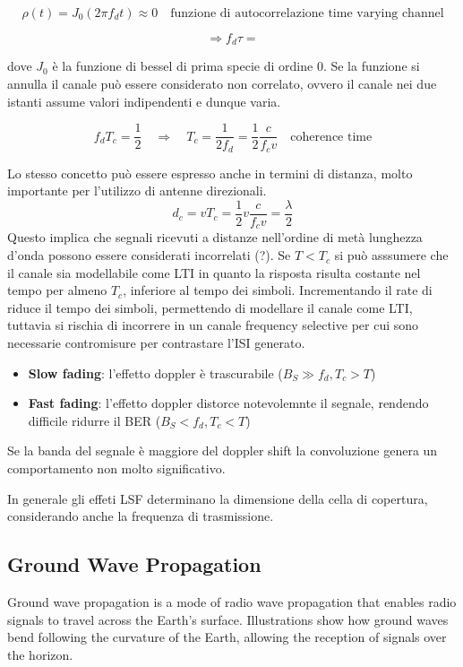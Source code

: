 \[
    \rho (t) = J_0(2\pi f_d t) \approx 0 \quad \text{funzione di autocorrelazione time varying channel}
\]

\[
    \Rightarrow f_d \tau = 
\]


dove $J_0$ è la funzione di bessel di prima specie di ordine 0.  Se la funzione si annulla il canale può essere considerato non correlato, ovvero il canale nei due istanti assume valori indipendenti e dunque varia.


\[
    f_d T_c = \frac{1}{2} \quad \Rightarrow \quad  T_c = \frac{1}{2 f_d} = \frac{1}{2} \frac{c}{f_c v} \quad \text{coherence time}
\]

Lo stesso concetto può essere espresso anche in termini di distanza, molto importante per l'utilizzo di antenne direzionali.
\[
    d_c = v T_c = \frac{1}{2} v \frac{c}{f_c v} = \frac{\lambda}{2}
\]
Questo implica che segnali ricevuti a distanze nell'ordine di metà lunghezza d'onda possono essere considerati incorrelati (?).
Se $T < T_c$ si può asssumere che il canale sia modellabile come LTI in quanto la risposta risulta costante nel tempo per almeno $T_c$, inferiore al tempo dei simboli.
Incrementando il rate di riduce il tempo dei simboli, permettendo di modellare il canale come LTI, tuttavia si rischia di incorrere in un canale frequency selective per cui sono necessarie contromisure per contrastare l'ISI generato.  

\begin{itemize}
    \item \textbf{Slow fading}: l'effetto doppler è trascurabile ($B_S \gg f_d, T_c > T$)
    \item \textbf{Fast fading}: l'effetto doppler distorce notevolemnte il segnale, rendendo difficile ridurre il BER ($B_S < f_d, T_c < T$)
\end{itemize}
Se la banda del segnale è maggiore del doppler shift la convoluzione genera un comportamento non molto significativo.

In generale gli effeti LSF determinano la dimensione della cella di copertura, considerando anche la frequenza di trasmissione.



\subsection*{Ground Wave Propagation}
Ground wave propagation is a mode of radio wave propagation that enables radio signals to travel across the Earth's surface. Illustrations show how ground waves bend following the curvature of the Earth, allowing the reception of signals over the horizon.

